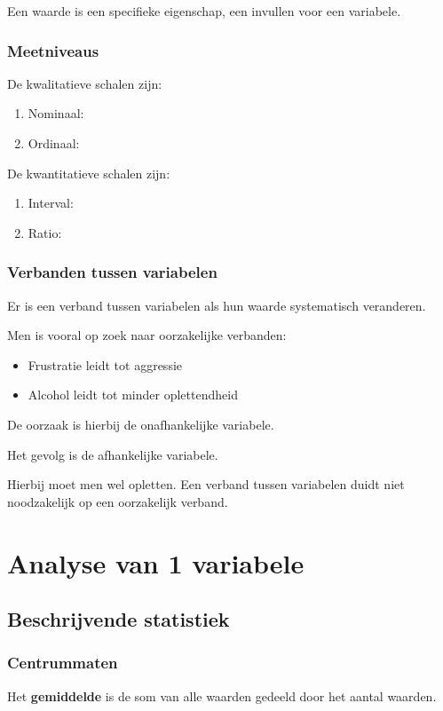 \documentclass[a4paper,12pt]{article}
\begin{document}
Een waarde is een specifieke eigenschap, een invullen voor een variabele.

\subsubsection{Meetniveaus}
De kwalitatieve schalen zijn:

\begin{enumerate}
\item 	Nominaal:
\item	Ordinaal:
\end{enumerate}

De kwantitatieve schalen zijn:
\begin{enumerate}
\item 	Interval:
\item	Ratio:
\end{enumerate}

\subsubsection{Verbanden tussen variabelen}
Er is een verband tussen variabelen als hun waarde systematisch veranderen.

Men is vooral op zoek naar oorzakelijke verbanden:
\begin{itemize}
\item Frustratie leidt tot aggressie
\item Alcohol leidt tot minder oplettendheid
\end{itemize}
De oorzaak is hierbij de onafhankelijke variabele.

Het gevolg is de afhankelijke variabele.

Hierbij moet men wel opletten. Een verband tussen variabelen duidt niet noodzakelijk op een oorzakelijk verband.

\section{Analyse van 1 variabele}
\subsection{Beschrijvende statistiek}
\subsubsection{Centrummaten}
Het \textbf{gemiddelde} is de som van alle waarden gedeeld door het aantal waarden.
\end{document}
